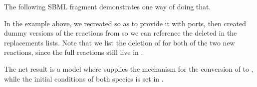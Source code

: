 The following SBML fragment demonstrates one way of doing that.


In the example above, we recreated  so as to provide it with ports, then created dummy versions of the reactions from  so we can reference the deleted  in the replacements lists.  Note that we list the deletion of  for both of the two new reactions, since the full reactions still live in .

The net result is a model where  supplies the mechanism for the conversion of  to , while the initial conditions of both species is set in .

